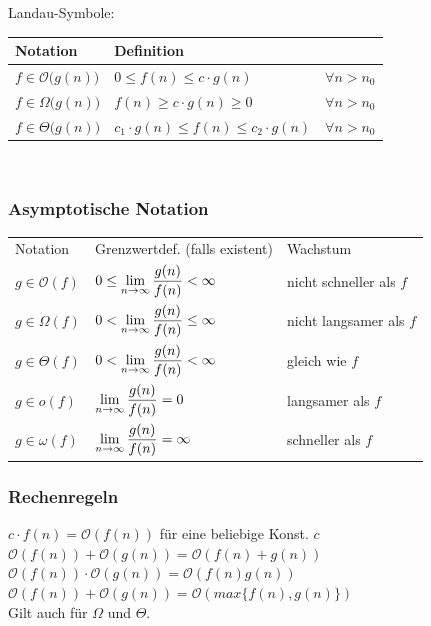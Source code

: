 \documentclass[fs, footer]{latex4ei}
\begin{document}
\begin{multicols*}{4}
Landau-Symbole:\\
\begin{tabular}{l|ll}
	Notation & Definition\\ \hline
	$f \in \mathcal O \bigl(g(n)\bigr)$ & $0 \le f(n) \le c \cdot g(n)$ & $\forall n > n_0$\\
	$f \in \Omega \bigl(g(n)\bigr)$ & $f(n) \ge c \cdot g(n) \ge 0$ & $\forall n > n_0$\\
	$f \in \Theta \bigl( g(n) \bigr)$ &  $c_1 \cdot g(n) \le f(n) \le c_2 \cdot g(n)$ & $\forall n > n_0$\\
\end{tabular}\\
\subsubsection{Asymptotische Notation}
\begin{tabular}{l|l|l}
Notation & Grenzwertdef. (falls existent) & Wachstum \\
\brule
$g \in \mathcal O (f)$ & $0 \leq \lim_{n \rightarrow \infty}\fr{g(n)}{f(n)} < \infty$ & nicht schneller als $f$\\
$g \in \Omega (f)$ & $0 < \lim_{n \rightarrow \infty}\fr{g(n)}{f(n)} \leq \infty$ & nicht langsamer als $f$\\
$g \in \Theta (f)$ & $0 < \lim_{n \rightarrow \infty}\fr{g(n)}{f(n)} < \infty$ & gleich wie $f$\\
$g \in o(f)$ & $\lim_{n \rightarrow \infty}\fr{g(n)}{f(n)} = 0$ & langsamer als $f$\\
$g \in \omega (f)$ & $\lim_{n \rightarrow \infty}\fr{g(n)}{f(n)} = \infty$ & schneller als $f$\\
\end{tabular}

\subsubsection{Rechenregeln}

$c \cdot f(n) = \mathcal O(f(n))$ für eine beliebige Konst. $c$\\
$\mathcal O(f(n)) + \mathcal O(g(n)) = \mathcal O(f(n) + g(n))$\\
$\mathcal O(f(n)) \cdot \mathcal O(g(n)) = \mathcal O(f(n)g(n))$\\
$\mathcal O(f(n)) + \mathcal O(g(n)) = \mathcal O(max\{f(n),g(n)\})$\\
Gilt auch für $\Omega$ und $\Theta$.


\end{multicols*}
\end{document}
